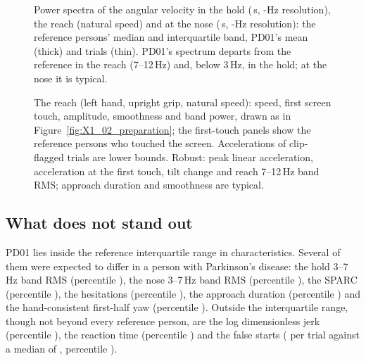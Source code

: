 \begin{figure}[htbp]
  \centering
  \caption{Power spectra of the angular velocity in the hold (\,s, -Hz resolution), the reach (natural speed) and at the nose (\,s, -Hz resolution): the reference persons' median and interquartile band, PD01's mean (thick) and trials (thin).
    PD01's spectrum departs from the reference in the reach (7--12\,Hz) and, below 3\,Hz, in the hold; at the nose it is typical.}
  \label{fig:X1_03_spectra}\label{fig:app:pd01-spectra}
\end{figure}

\begin{figure}[htbp]
  \centering
  \caption{The reach (left hand, upright grip, natural speed): speed, first screen touch, amplitude, smoothness and band power, drawn as in Figure~\ref{fig:X1_02_preparation}; the first-touch panels show the  reference persons who touched the screen.
    Accelerations of clip-flagged trials are lower bounds.
    Robust: peak linear acceleration, acceleration at the first touch, tilt change and reach 7--12\,Hz band RMS; approach duration and smoothness are typical.}
  \label{fig:X1_04_movement}\label{fig:app:pd01-movement}
\end{figure}


\FloatBarrier
\subsection{What does not stand out}\label{app:pd01:typical}

PD01 lies inside the reference interquartile range in  characteristics.
Several of them were expected to differ in a person with Parkinson's disease:
the hold 3--7\,Hz band RMS (percentile ),
the nose 3--7\,Hz band RMS (percentile ),
the SPARC (percentile ),
the hesitations (percentile ),
the approach duration (percentile )
and the hand-consistent first-half yaw (percentile ).
Outside the interquartile range, though not beyond every reference person, are the log dimensionless jerk (percentile ), the reaction time (percentile ) and the false starts ( per trial against a median of , percentile ).

